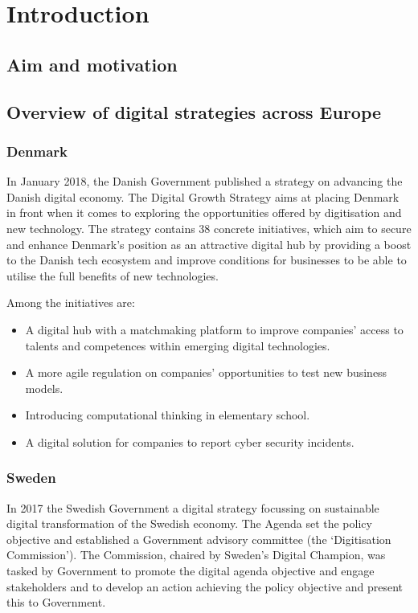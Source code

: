 \setcounter{page}{1} 
\chapter{Introduction} 

\section{Aim and motivation}
\label{sec:aimMotivation}

\section{Overview of digital strategies across Europe}

\subsection{Denmark}

In January 2018, the Danish Government published a strategy on advancing the Danish digital economy. The Digital Growth Strategy aims at placing Denmark in front when it comes to exploring the opportunities offered by digitisation and new technology. The strategy contains 38 concrete initiatives, which aim to secure and enhance Denmark’s position as an attractive digital hub by providing a boost to the Danish tech ecosystem and improve conditions for businesses to be able to utilise the full benefits of new technologies.

Among the initiatives are:
\begin{itemize}
\item A digital hub with a matchmaking platform to improve companies' access to talents and competences within emerging digital technologies.
\item A more agile regulation on companies' opportunities to test new business models.
\item Introducing computational thinking in elementary school.
\item A digital solution for companies to report cyber security incidents.
\end{itemize}

\subsection{Sweden}

In 2017 the Swedish Government a digital strategy focussing on sustainable digital transformation of the Swedish economy. The Agenda set the policy objective and established a Government advisory committee (the `Digitisation Commission'). The Commission, chaired by Sweden's Digital Champion, was tasked by Government to promote the digital agenda objective and engage stakeholders and to develop an action achieving the policy objective and present this to Government.

